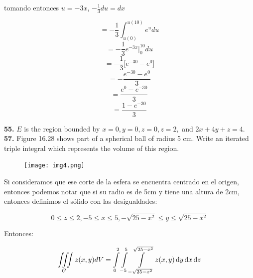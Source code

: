 \documentclass[11pt]{report}
\begin{document}
tomando entonces $u = -3x$, $ - \frac{1}{3} du = dx$

	$$ = - \frac{1}{3} \int_{u(0)}^{u(10)} e^{u} du  $$
	$$ = - \frac{1}{3}  e^{-3x} \Big|_{0}^{10} du  $$
	$$ = - \frac{1}{3} \Big[ e^{-30} - e^0 \Big]  $$
	$$ = - \frac{ e^{-30} - e^0  }{3}  $$
	$$ = \frac{ e^0 - e^{-30} }{3}  $$
	$$ = \frac{ 1 - e^{-30} }{3}  $$


\textbf{55.} $E$ is the region bounded by $x = 0, y = 0, z = 0, z = 2,$
and $2x + 4y + z = 4$. \\

\textbf{57.} Figure 16.28 shows part of a spherical ball of radius 5 cm.
Write an iterated triple integral which represents the volume of this region. \\

\begin{figure}[h]
\texttt{[image: img4.png]}
\centering
\end{figure}

Si consideramos que ese corte de la esfera se encuentra centrado en el origen,
entonces podemos notar que si su radio es de 5cm y tiene una altura de 2cm,
entonces definimos el sólido con las desigualdades:

\[ 0 \leq z \leq 2, -5 \leq x \leq 5, - \sqrt{25 - x^2} \leq y \leq \sqrt{25 - x^2}\]

Entonces:

\[ \iiint \limits_G z(x,y) dV = \int \limits_0^2 \int \limits_{-5}^5
        \int \limits_{- \sqrt{25 - x^2}}^{\sqrt{25 - x^2}} z(x,y) \, \text dy \, \text dx \, \text dz  \]
\end{document}
